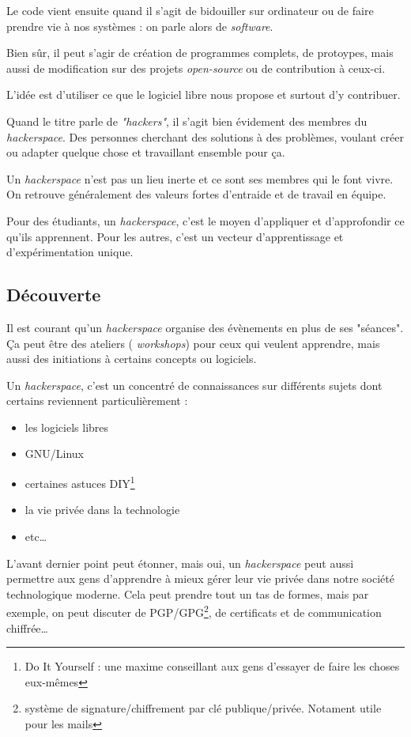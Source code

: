 \documentclass[a4paper, 11pt]{report}
\newcommand{\hs}{{\itshape hackerspace}}
\newcommand{\sw}{{\itshape software}}
\begin{document}
Le code vient ensuite quand il s'agit de bidouiller sur ordinateur ou de faire prendre vie à nos systèmes : on parle
alors de \sw.

Bien sûr, il peut s'agir de création de programmes complets, de protoypes, mais aussi de modification sur des projets
{\itshape open-source} ou de contribution à ceux-ci.

L'idée est d'utiliser ce que le logiciel libre nous propose et surtout d'y contribuer.

\medskip

Quand le titre parle de {\it "hackers"}, il s'agit bien évidement des membres du \hs.
Des personnes cherchant des solutions à des problèmes, voulant créer ou adapter quelque chose et travaillant ensemble
pour ça.

Un \hs{} n'est pas un lieu inerte et ce sont ses membres qui le font vivre. On retrouve généralement des valeurs fortes
d'entraide et de travail en équipe.

Pour des étudiants, un \hs, c'est le moyen d'appliquer et d'approfondir ce qu'ils apprennent.
Pour les autres, c'est un vecteur d'apprentissage et d'expérimentation unique.

    \subsection{Découverte}

    Il est courant qu'un \hs{} organise des évènements en plus de ses "séances". Ça peut être des ateliers ({\it
workshops}) pour ceux qui veulent apprendre, mais aussi des initiations à certains concepts ou logiciels.

Un \hs, c'est un concentré de connaissances sur différents sujets dont certains reviennent particulièrement :

\begin{itemize}
    \item les logiciels libres
    \item GNU/Linux
    \item certaines astuces DIY\footnote{Do It Yourself : une maxime conseillant aux gens d'essayer de faire les choses
    eux-mêmes}
    \item la vie privée dans la technologie
    \item etc\ldots
\end{itemize}

L'avant dernier point peut étonner, mais oui, un \hs{} peut aussi permettre aux gens d'apprendre à mieux gérer leur vie
privée dans notre société technologique moderne. Cela peut prendre tout un tas de formes, mais par exemple, on peut
discuter de PGP/GPG\footnote{système de signature/chiffrement par clé publique/privée. Notament utile pour les mails},
de certificats et de communication chiffrée\ldots
\end{document}
